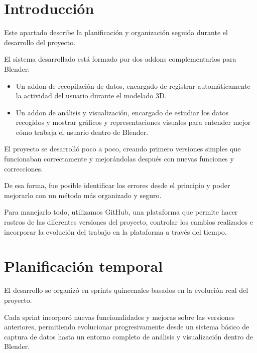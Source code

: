 
\section{Introducción}

Este apartado describe la planificación y organización seguida durante el desarrollo del proyecto.

El sistema desarrollado está formado por dos addons complementarios para Blender:

\begin{itemize}
    \item Un addon de recopilación de datos, encargado de registrar automáticamente la actividad del usuario durante el modelado 3D.
    
   \item Un addon de análisis y visualización, encargado de estudiar los datos recogidos y mostrar gráficos y representaciones visuales para entender mejor cómo trabaja el usuario dentro de Blender.
\end{itemize}

El proyecto se desarrolló poco a poco, creando primero versiones simples que funcionaban correctamente y mejorándolas después con nuevas funciones y correcciones.

De esa forma, fue posible identificar los errores desde el principio y poder mejorarlo con un método más organizado y seguro.

Para manejarlo todo, utilizamos GitHub, una plataforma que permite hacer rastros de las diferentes versiones del proyecto, controlar los cambios realizados e incorporar la evolución del trabajo en la plataforma a través del tiempo.

\section{Planificación temporal}

El desarrollo se organizó en sprints quincenales basados en la evolución real del proyecto.

Cada sprint incorporó nuevas funcionalidades y mejoras sobre las versiones anteriores, permitiendo evolucionar progresivamente desde un sistema básico de captura de datos hasta un entorno completo de análisis y visualización dentro de Blender.

